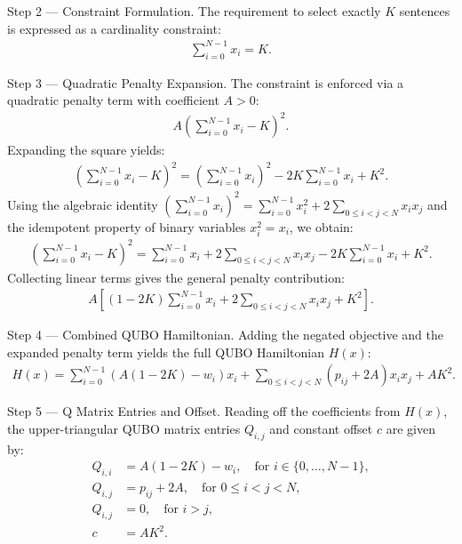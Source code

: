 \documentclass[12pt]{article}
\begin{document}
Step 2 --- Constraint Formulation.
The requirement to select exactly $K$ sentences is expressed as a cardinality constraint:
\begin{align}
\sum_{i=0}^{N-1} x_i = K.
\end{align}

Step 3 --- Quadratic Penalty Expansion.
The constraint is enforced via a quadratic penalty term with coefficient $A > 0$:
\begin{align}
A \left( \sum_{i=0}^{N-1} x_i - K \right)^2.
\end{align}
Expanding the square yields:
\begin{align}
\left( \sum_{i=0}^{N-1} x_i - K \right)^2 = \left( \sum_{i=0}^{N-1} x_i \right)^2 - 2K \sum_{i=0}^{N-1} x_i + K^2.
\end{align}
Using the algebraic identity $\left( \sum_{i=0}^{N-1} x_i \right)^2 = \sum_{i=0}^{N-1} x_i^2 + 2 \sum_{0 \leq i < j < N} x_i x_j$ and the idempotent property of binary variables $x_i^2 = x_i$, we obtain:
\begin{align}
\left( \sum_{i=0}^{N-1} x_i - K \right)^2 = \sum_{i=0}^{N-1} x_i + 2 \sum_{0 \leq i < j < N} x_i x_j - 2K \sum_{i=0}^{N-1} x_i + K^2.
\end{align}
Collecting linear terms gives the general penalty contribution:
\begin{align}
A \left[ (1 - 2K) \sum_{i=0}^{N-1} x_i + 2 \sum_{0 \leq i < j < N} x_i x_j + K^2 \right].
\end{align}

Step 4 --- Combined QUBO Hamiltonian.
Adding the negated objective and the expanded penalty term yields the full QUBO Hamiltonian $H(x)$:
\begin{align}
H(x) = \sum_{i=0}^{N-1} \left( A(1 - 2K) - w_i \right) x_i + \sum_{0 \leq i < j < N} \left( p_{ij} + 2A \right) x_i x_j + A K^2.
\end{align}

Step 5 --- Q Matrix Entries and Offset.
Reading off the coefficients from $H(x)$, the upper-triangular QUBO matrix entries $Q_{i,j}$ and constant offset $c$ are given by:
\begin{align}
Q_{i,i} &= A(1 - 2K) - w_i, \quad \text{for } i \in \{0, \dots, N-1\}, \\
Q_{i,j} &= p_{ij} + 2A, \quad \text{for } 0 \leq i < j < N, \\
Q_{i,j} &= 0, \quad \text{for } i > j, \\
c &= A K^2.
\end{align}
\end{document}
